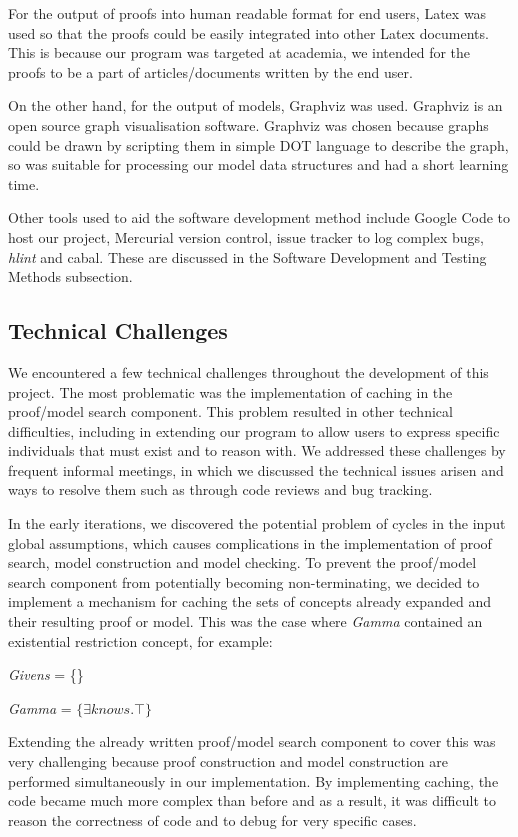 For the output of proofs into human readable format for end users, Latex was used so that the proofs could be easily integrated into other Latex documents. This is because our program was targeted at academia, we intended for the proofs to be a part of articles/documents written by the end user.

On the other hand, for the output of models, Graphviz was used. Graphviz is an open source graph visualisation software. Graphviz was chosen because graphs could be drawn by scripting them in simple DOT language to describe the graph, so was suitable for processing our model data structures and had a short learning time.

Other tools used to aid the software development method include Google Code to host our project, Mercurial version control, issue tracker to log complex bugs, \emph{hlint} and cabal. These are discussed in the Software Development and Testing Methods subsection.

\subsection{Technical Challenges}

We encountered a few technical challenges throughout the development of this project. The most problematic was the implementation of caching in the proof/model search component. This problem resulted in other technical difficulties, including in extending our program to allow users to express specific individuals that must exist and to reason with. We addressed these challenges by frequent informal meetings, in which we discussed the technical issues arisen and ways to resolve them such as through code reviews and bug tracking.

In the early iterations, we discovered the potential problem of cycles in the input global assumptions, which causes complications in the implementation of proof search, model construction and model checking. To prevent the proof/model search component from potentially becoming non-terminating, we decided to implement a mechanism for caching the sets of concepts already expanded and their resulting proof or model. This was the case where \textit{Gamma} contained an existential restriction concept, for example:

\textit{Givens} = \{\}

\textit{Gamma} = $\{ \exists knows . \top \}$

Extending the already written proof/model search component to cover this was very challenging because proof construction and model construction are performed simultaneously in our implementation. By implementing caching, the code became much more complex than before and as a result, it was difficult to reason the correctness of code and to debug for very specific cases.

